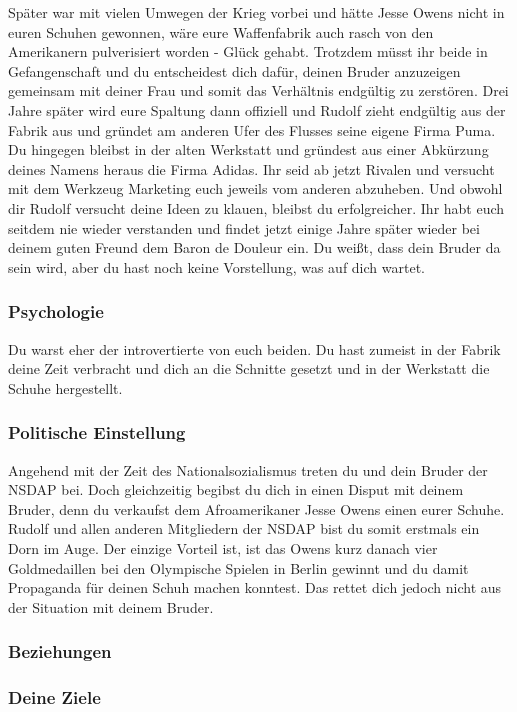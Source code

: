 \documentclass[12pt, a4paper, openany]{report}
\begin{document}
Später war mit vielen Umwegen der Krieg vorbei und hätte Jesse Owens nicht in euren Schuhen gewonnen, wäre eure Waffenfabrik auch rasch von den Amerikanern pulverisiert worden - Glück gehabt. Trotzdem müsst ihr beide in Gefangenschaft und du entscheidest dich dafür, deinen Bruder anzuzeigen gemeinsam mit deiner Frau und somit das Verhältnis endgültig zu zerstören. Drei Jahre später wird eure Spaltung dann offiziell und Rudolf zieht endgültig aus der Fabrik aus und gründet am anderen Ufer des Flusses seine eigene Firma Puma. Du hingegen bleibst in der alten Werkstatt und gründest aus einer Abkürzung deines Namens heraus die Firma Adidas. Ihr seid ab jetzt Rivalen und versucht mit dem Werkzeug Marketing euch jeweils vom anderen abzuheben. Und obwohl dir Rudolf versucht deine Ideen zu klauen, bleibst du erfolgreicher. Ihr habt euch seitdem nie wieder verstanden und findet jetzt einige Jahre später wieder bei deinem guten Freund dem Baron de Douleur ein. Du weißt, dass dein Bruder da sein wird, aber du hast noch keine Vorstellung, was auf dich wartet.

\subsubsection{Psychologie}
Du warst eher der introvertierte von euch beiden. Du hast zumeist in der Fabrik deine Zeit verbracht und dich an die Schnitte gesetzt und in der Werkstatt die Schuhe hergestellt. 

\subsubsection{Politische Einstellung}
Angehend mit der Zeit des Nationalsozialismus treten du und dein Bruder der NSDAP bei. Doch gleichzeitig begibst du dich in einen Disput mit deinem Bruder, denn du verkaufst dem Afroamerikaner Jesse Owens einen eurer Schuhe. Rudolf und allen anderen Mitgliedern der NSDAP bist du somit erstmals ein Dorn im Auge. Der einzige Vorteil ist, ist das Owens kurz danach vier Goldmedaillen bei den Olympische Spielen in Berlin gewinnt und du damit Propaganda für deinen Schuh machen konntest. Das rettet dich jedoch nicht aus der Situation mit deinem Bruder. 


\subsubsection{Beziehungen}

\subsubsection{Deine Ziele}
\end{document}
